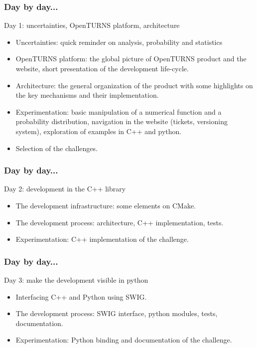 \documentclass{beamer}
\begin{document}
\begin{frame}
  \frametitle{Day by day...}
  \begin{block}{Day 1: uncertainties, OpenTURNS platform, architecture}
    \begin{itemize}
    \item Uncertainties: quick reminder on analysis, probability and statistics
    \item OpenTURNS platform: the global picture of OpenTURNS product and the website, short presentation of the development life-cycle.
    \item Architecture: the general organization of the product with some highlights on the key mechanisms and their implementation.
    \item Experimentation: basic manipulation of a numerical function and a probability distribution, navigation in the website (tickets, versioning system), exploration of examples in C++ and python.
    \item Selection of the challenges.
    \end{itemize}
  \end{block}
\end{frame}
\begin{frame}
  \frametitle{Day by day...}
  \begin{block}{Day 2: development in the C++ library}
    \begin{itemize}
    \item The development infrastructure: some elements on CMake.
    \item The development process: architecture, C++ implementation, tests.
    \item Experimentation: C++ implementation of the challenge.
    \end{itemize}
  \end{block}
\end{frame}
\begin{frame}
  \frametitle{Day by day...}
  \begin{block}{Day 3: make the development visible in python}
    \begin{itemize}
    \item Interfacing C++ and Python using SWIG.
    \item The development process: SWIG interface, python modules, tests, documentation.
    \item Experimentation: Python binding and documentation of the challenge.
    \end{itemize}
  \end{block}
\end{frame}
\end{document}
